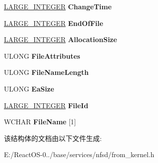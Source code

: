 \begin{DoxyCompactItemize}
\hyperlink{union___l_a_r_g_e___i_n_t_e_g_e_r}{L\+A\+R\+G\+E\+\_\+\+I\+N\+T\+E\+G\+ER} {\bfseries Change\+Time}
\item 
\mbox{\label{struct___f_i_l_e___i_d___f_u_l_l___d_i_r___i_n_f_o_a50f46372e9d783a35abc72cdecae7f28}} 
\hyperlink{union___l_a_r_g_e___i_n_t_e_g_e_r}{L\+A\+R\+G\+E\+\_\+\+I\+N\+T\+E\+G\+ER} {\bfseries End\+Of\+File}
\item 
\mbox{\label{struct___f_i_l_e___i_d___f_u_l_l___d_i_r___i_n_f_o_a3a028915c595337e2ee7bb8a2c47f4e1}} 
\hyperlink{union___l_a_r_g_e___i_n_t_e_g_e_r}{L\+A\+R\+G\+E\+\_\+\+I\+N\+T\+E\+G\+ER} {\bfseries Allocation\+Size}
\item 
\mbox{\label{struct___f_i_l_e___i_d___f_u_l_l___d_i_r___i_n_f_o_a4233618a79c6a88a4c92df65babb90e6}} 
U\+L\+O\+NG {\bfseries File\+Attributes}
\item 
\mbox{\label{struct___f_i_l_e___i_d___f_u_l_l___d_i_r___i_n_f_o_af9e48c4247b70268dcd946bb2702ceea}} 
U\+L\+O\+NG {\bfseries File\+Name\+Length}
\item 
\mbox{\label{struct___f_i_l_e___i_d___f_u_l_l___d_i_r___i_n_f_o_a7b5a42e687dbc0815eedf6a77688c036}} 
U\+L\+O\+NG {\bfseries Ea\+Size}
\item 
\mbox{\label{struct___f_i_l_e___i_d___f_u_l_l___d_i_r___i_n_f_o_a870369525bc599baa48d309b25b564c9}} 
\hyperlink{union___l_a_r_g_e___i_n_t_e_g_e_r}{L\+A\+R\+G\+E\+\_\+\+I\+N\+T\+E\+G\+ER} {\bfseries File\+Id}
\item 
\mbox{\label{struct___f_i_l_e___i_d___f_u_l_l___d_i_r___i_n_f_o_a43bab28acbc7c2cbcb8a3011c344a360}} 
W\+C\+H\+AR {\bfseries File\+Name} \mbox{[}1\mbox{]}
\end{DoxyCompactItemize}


该结构体的文档由以下文件生成\+:\begin{DoxyCompactItemize}
\item 
E\+:/\+React\+O\+S-\/0../base/services/nfsd/from\+\_\+kernel.\+h\end{DoxyCompactItemize}
